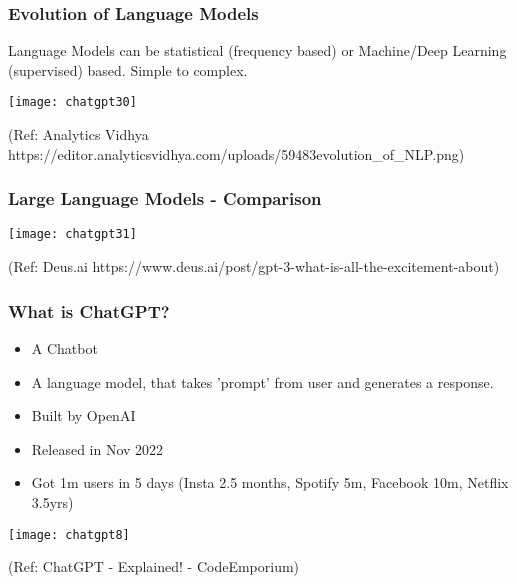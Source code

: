 \begin{frame}[fragile]\frametitle{Evolution of Language Models}

Language Models can be statistical (frequency based) or Machine/Deep Learning (supervised) based. Simple to complex.

\begin{center}
\texttt{[image: chatgpt30]}
\end{center}				
{\tiny (Ref: Analytics Vidhya https://editor.analyticsvidhya.com/uploads/59483evolution\_of\_NLP.png)}

\end{frame}

\begin{frame}[fragile]\frametitle{Large Language Models - Comparison}

\begin{center}
\texttt{[image: chatgpt31]}
\end{center}				
{\tiny (Ref: Deus.ai https://www.deus.ai/post/gpt-3-what-is-all-the-excitement-about)}

\end{frame}



\begin{frame}[fragile]\frametitle{What is ChatGPT?}


\begin{itemize}
\item A Chatbot
\item A language model, that takes 'prompt' from user and generates a response.
\item Built by OpenAI
\item Released in Nov 2022
\item Got 1m users in 5 days  (Insta 2.5 months, Spotify 5m, Facebook 10m, Netflix 3.5yrs)
\end{itemize}	 

\begin{center}
\texttt{[image: chatgpt8]}
\end{center}				
{\tiny (Ref: ChatGPT - Explained! - CodeEmporium)}
			
			
\end{frame}

